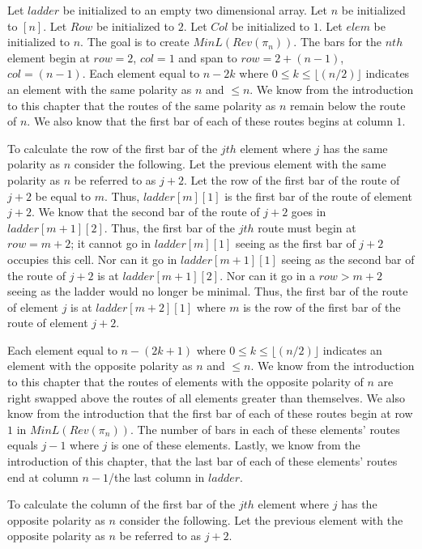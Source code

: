 Let $ladder$ be initialized to an empty two dimensional array. Let $n$ be initialized to $[n]$. Let $Row$ be initialized to 
$2$. Let $Col$ be initialized to $1$. Let $elem$ be initialized to $n$. The goal is to create $MinL(Rev(\pi_{n}))$.
The bars for the $nth$ element begin at $row=2$, 
$col=1$ and span to $row=2+(n-1)$, $col=(n-1)$. Each element equal to $n-2k$ where $0 \leq k \leq \lfloor(n/2)\rfloor$ indicates an element with the 
same polarity as $n$ and $\leq n$. We know from the introduction to this chapter that the routes of the same polarity as $n$ remain 
below the route of $n$. We also know that the first bar of each of these routes begins at column $1$.\par 
To calculate the row of the first bar of the $jth$ element where $j$ has the 
same polarity as $n$ consider the following. Let the previous element with the same polarity as $n$ be referred to as $j+2$.
Let the row of the first bar of the route of $j+2$ be equal to $m$. Thus, $ladder[m][1]$ is the first bar 
of the route of element $j+2$. We know that the second bar of the route of $j+2$ goes in $ladder[m+1][2]$. Thus, the 
first bar of the $jth$ route must begin at $row=m+2$; it cannot go in $ladder[m][1]$ seeing as the first bar 
of $j+2$ occupies this cell. Nor can it go in $ladder[m+1][1]$ seeing as the second bar of the route of $j+2$ 
is at $ladder[m+1][2]$. Nor can it go in a $row > m+2$ seeing as the ladder would no longer be minimal. Thus, 
the first bar of the route of element $j$ is at $ladder[m+2][1]$ where $m$ is the row of the first bar of the route 
of element $j+2$.\par 
Each element equal to $n-(2k+1)$  where $0 \leq k \leq \lfloor(n/2)\rfloor$ indicates an element with the opposite polarity as $n$ and $\leq n$. We know 
from the introduction to this chapter that the routes of elements with the opposite polarity of $n$ are right swapped above the routes 
of all elements greater than themselves. We also know from the introduction that the first 
bar of each of these routes begin at row $1$ in $MinL(Rev(\pi_{n}))$. The number of bars in each of these elements' 
routes equals $j-1$ where $j$ is one of these elements. Lastly, we know from the introduction of this chapter, that the last 
bar of each of these elements' routes end at column $n-1$/the last column in $ladder$.\par 
To calculate the column of the first bar of the $jth$ element where $j$ has the opposite polarity 
as $n$ consider the following. Let the previous element with the opposite polarity as $n$ be referred to as $j+2$. 

